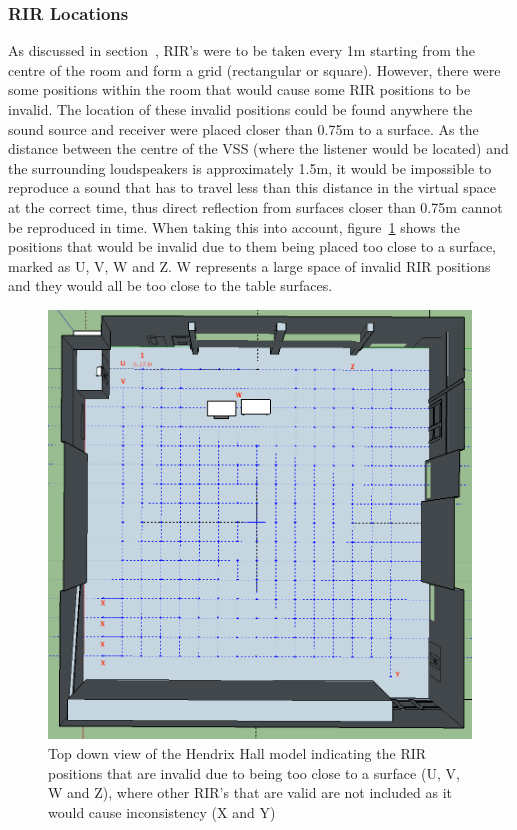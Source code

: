 \documentclass[../../main.tex]{subfiles}
\begin{document}
		\subsubsection{RIR Locations}
		\label{rirlocations}
			As discussed in section~, \ac{RIR}'s were to be taken every 1m starting from the centre of the room and form a grid (rectangular or square). However, there were some positions within the room that would cause some \ac{RIR} positions to be invalid. The location of these invalid positions could be found anywhere the sound source and receiver were placed closer than 0.75m to a surface. As the distance between the centre of the \ac{VSS} (where the listener would be located) and the surrounding loudspeakers is approximately 1.5m, it would be impossible to reproduce a sound that has to travel less than this distance in the virtual space at the correct time, thus direct reflection from surfaces closer than 0.75m cannot be reproduced in time. When taking this into account, figure~\ref{incorrectRIRPositions} shows the positions that would be invalid due to them being placed too close to a surface, marked as U, V, W and Z. W represents a large space of invalid \ac{RIR} positions and they would all be too close to the table surfaces.

			\begin{figure}[H]
				\centerline{\includegraphics[scale = 0.37]{Sections/Implementation/Odeon/images/RIRPositions/RIRPositionAnnotated.png}}
				\caption{Top down view of the Hendrix Hall model indicating the \ac{RIR} positions that are invalid due to being too close to a surface (U, V, W and Z), where other \ac{RIR}'s that are valid are not included as it would cause inconsistency (X and Y)}
				\label{incorrectRIRPositions}
			\end{figure}
\end{document}
